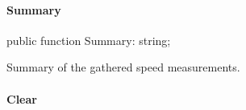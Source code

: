 \documentclass{report}
\newif\ifpdf
\begin{document}
\paragraph*{Summary}\hspace*{\fill}

\label{ok_nested_2.TCastleProfiler-Summary}
\begin{list}{}{
\setlength{\itemindent}{0cm}
\setlength{\listparindent}{0cm}
\setlength{\leftmargin}{\evensidemargin}
\addtolength{\leftmargin}{\tmplength}
\settowidth{\labelsep}{X}
\addtolength{\leftmargin}{\labelsep}
\setlength{\labelwidth}{\tmplength}
}
\item[\textbf{Declaration}\hfill]
\ifpdf
\begin{flushleft}
\fi
\begin{ttfamily}
public function Summary: string;\end{ttfamily}

\ifpdf
\end{flushleft}
\fi

\par
\item[\textbf{Description}]
Summary of the gathered speed measurements.

\end{list}
\paragraph*{Clear}\hspace*{\fill}
\end{document}

